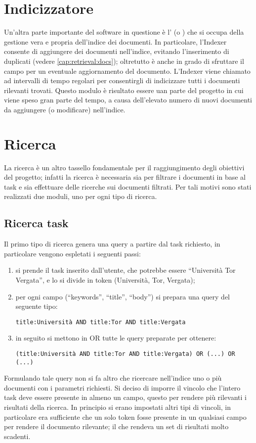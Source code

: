 \section{Indicizzatore}\label{cap:retrieval:indexer}
Un'altra parte importante del software in questione è l' (o ) che si occupa della gestione vera e propria dell'indice dei documenti. In particolare, l'Indexer consente di aggiungere dei documenti nell'indice, evitando l'inserimento di duplicati (vedere \ref{cap:retrieval:docs}); oltretutto è anche in grado di sfruttare il campo  per un eventuale aggiornamento del documento. L'Indexer viene chiamato ad intervalli di tempo regolari per consentirgli di indicizzare tutti i documenti rilevanti trovati.
Questo modulo è risultato essere uan parte del progetto in cui viene speso gran parte del tempo, a causa dell'elevato numero di nuovi documenti da aggiungere (o modificare) nell'indice.
\section{Ricerca}\label{cap:retrieval:searcher}
La ricerca è un altro tassello fondamentale per il raggiungimento degli obiettivi del progetto; infatti la ricerca è necessaria sia per filtrare i documenti in base al task e sia effettuare delle ricerche sui documenti filtrati. Per tali motivi sono stati realizzati due moduli, uno per ogni tipo di ricerca.
\subsection{Ricerca task}
Il primo tipo di ricerca genera una query a partire dal task richiesto, in particolare vengono espletati i seguenti passi:
\begin{enumerate}
\item si prende il task inserito dall'utente, che potrebbe essere ``Università Tor Vergata'', e lo si divide in token (Università, Tor, Vergata);
\item per ogni campo (``keywords'', ``title'', ``body'') si prepara una query del seguente tipo:
\begin{center}
\texttt{title:Università AND title:Tor AND title:Vergata}
\end{center}
\item in seguito si mettono in OR tutte le query preparate per ottenere:
\begin{center}
\texttt{(title:Università AND title:Tor AND title:Vergata) OR (...) OR (...)}
\end{center}
\end{enumerate}
Formulando tale query non si fa altro che ricercare nell'indice uno o più documenti con i parametri richiesti. Si deciso di imporre il vincolo che l'intero task deve essere presente in almeno un campo, questo per rendere più rilevanti i risultati della ricerca. In principio si erano impostati altri tipi di vincoli, in particolare era sufficiente che un solo token fosse presente in un qualsiasi campo per rendere il documento rilevante; il che rendeva un set di risultati molto scadenti.
